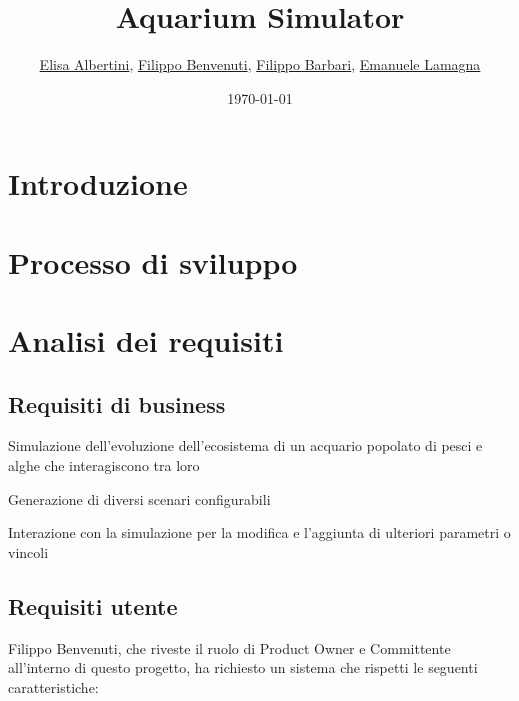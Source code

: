\documentclass[12pt,a4paper,oneside,article]{article}
\title{Aquarium Simulator}
\author{
	\href{mailto:filippo.barbari@studio.unibo.it}{Elisa Albertini},
	\href{mailto:filippo.barbari@studio.unibo.it}{Filippo Benvenuti},
	\href{mailto:filippo.barbari@studio.unibo.it}{Filippo Barbari},
	\href{mailto:filippo.barbari@studio.unibo.it}{Emanuele Lamagna}
}
\date{\today}
\begin{document}
	\maketitle
	
	\tableofcontents
	\clearpage

    \section{Introduzione}
    
    \section{Processo di sviluppo}
    
    \section{Analisi dei requisiti}
    \subsection{Requisiti di business}
    \begin{legal}[label*=1.\arabic*.]
   		\item Simulazione dell'evoluzione dell'ecosistema di un acquario popolato di pesci e alghe che interagiscono tra loro
   		\begin{legal}
   			\item Generazione di diversi scenari configurabili
   			\item Interazione con la simulazione per la modifica e l’aggiunta di ulteriori parametri o vincoli
   		\end{legal}
    \end{legal}

	\subsection{Requisiti utente}
	Filippo Benvenuti, che riveste il ruolo di Product Owner e Committente all'interno di questo progetto, ha richiesto un sistema che rispetti le seguenti caratteristiche:
	
\end{document}
